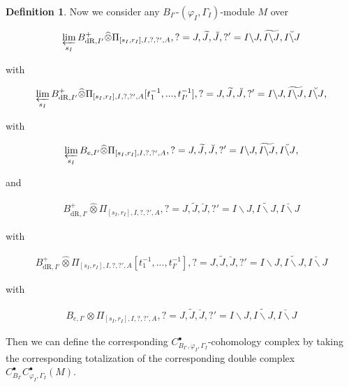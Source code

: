 \documentclass[12pt]{amsart}
\theoremstyle{definition}
\newtheorem{definition}[theorem]{Definition}
\numberwithin{equation}{section}
\begin{document}
\begin{definition}
Now we consider any $B_{I'}$-$(\varphi_I,\Gamma_I)$-module $M$ over 

\begin{align}
\varprojlim_{s_I}  B^+_{\mathrm{dR},I'}	\widehat{\otimes}\Pi_{[s_I,r_I],I,?,?',A},?=J,\widetilde{J},\breve{J},?'=I\backslash J,\widetilde{I\backslash J},\breve{I\backslash J}\\
\end{align}

with

\begin{align}
\varprojlim_{s_I} B^+_{\mathrm{dR},I'}	\widehat{\otimes}\Pi_{[s_I,r_I],I,?,?',A}[t_1^{-1},...,t_{I'}^{-1}],?=J,\widetilde{J},\breve{J},?'=I\backslash J,\widetilde{I\backslash J},\breve{I\backslash J},\\
\end{align}

with 

\begin{align}
\varprojlim_{s_I} B_{e,I'}	\widehat{\otimes}\Pi_{[s_I,r_I],I,?,?',A}, ?=J,\widetilde{J},\breve{J},?'=I\backslash J,\widetilde{I\backslash J},\breve{I\backslash J},\\
\end{align}

and


\begin{align}
B^+_{\mathrm{dR},I'}	\widehat{\otimes}\Pi_{[s_I,r_I],I,?,?',A},?=J,\widetilde{J},\breve{J},?'=I\backslash J,\widetilde{I\backslash J},\breve{I\backslash J}
\end{align}

with

\begin{align}
B^+_{\mathrm{dR},I'}	\widehat{\otimes}\Pi_{[s_I,r_I],I,?,?',A}[t_1^{-1},...,t_{I'}^{-1}],?=J,\widetilde{J},\breve{J},?'=I\backslash J,\widetilde{I\backslash J},\breve{I\backslash J}
\end{align}

with 

\begin{align}
B_{e,I'}	\widehat{\otimes}\Pi_{[s_I,r_I],I,?,?',A},?=J,\widetilde{J},\breve{J},?'=I\backslash J,\widetilde{I\backslash J},\breve{I\backslash J}
\end{align}

Then we can define the corresponding $C^\bullet_{B_{I'},\varphi_I,\Gamma_I}$-cohomology complex by taking the corresponding totalization of the corresponding double complex $C^\bullet_{B_{I'}}C^\bullet_{\varphi_I,\Gamma_I}(M)$.
\end{definition}
\end{document}
